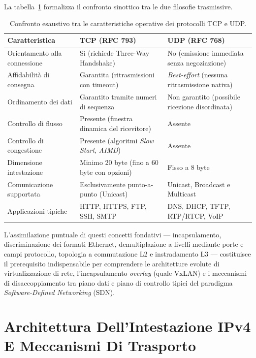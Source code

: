 \documentclass[11pt, a4paper]{article}
\begin{document}
La tabella~\ref{tab:tcp_udp_comparison} formalizza il confronto sinottico tra le due filosofie trasmissive.

\begin{table}[H]
    \centering
    \caption{Confronto esaustivo tra le caratteristiche operative dei protocolli TCP e UDP.}
    \label{tab:tcp_udp_comparison}
    \begin{tabularx}{\textwidth}{l X X}
        \toprule
        \textbf{Caratteristica} & \textbf{TCP (RFC 793)} & \textbf{UDP (RFC 768)} \\
        \midrule
        Orientamento alla connessione & Sì (richiede Three-Way Handshake) & No (emissione immediata senza negoziazione) \\
        Affidabilità di consegna & Garantita (ritrasmissioni con timeout) & \emph{Best-effort} (nessuna ritrasmissione nativa) \\
        Ordinamento dei dati & Garantito tramite numeri di sequenza & Non garantito (possibile ricezione disordinata) \\
        Controllo di flusso & Presente (finestra dinamica del ricevitore) & Assente \\
        Controllo di congestione & Presente (algoritmi \emph{Slow Start}, \emph{AIMD}) & Assente \\
        Dimensione intestazione & Minimo 20 byte (fino a 60 byte con opzioni) & Fisso a 8 byte \\
        Comunicazione supportata & Esclusivamente punto-a-punto (Unicast) & Unicast, Broadcast e Multicast \\
        Applicazioni tipiche & HTTP, HTTPS, FTP, SSH, SMTP & DNS, DHCP, TFTP, RTP/RTCP, VoIP \\
        \bottomrule
    \end{tabularx}
\end{table}

L'assimilazione puntuale di questi concetti fondativi — incapsulamento, discriminazione dei formati Ethernet, demultiplazione a livelli mediante porte e campi protocollo, topologia a commutazione L2 e instradamento L3 — costituisce il prerequisito indispensabile per comprendere le architetture evolute di virtualizzazione di rete, l'incapsulamento \emph{overlay} (quale VxLAN) e i meccanismi di disaccoppiamento tra piano dati e piano di controllo tipici del paradigma \emph{Software-Defined Networking} (SDN).


\section{Architettura Dell'Intestazione IPv4 E Meccanismi Di Trasporto}
\end{document}
